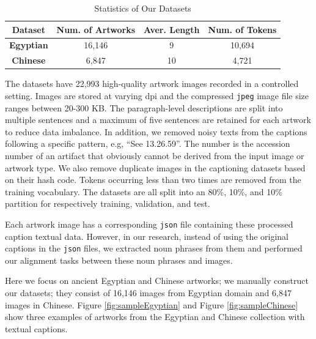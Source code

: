 \begin{table}[h!]
\centering
\begin{tabular}{|c|c|c|c|}
\hline
\textbf{Dataset}          & \textbf{Num. of Artworks} & \textbf{Aver. Length} & \textbf{Num. of Tokens} \\ \hline
\textbf{Egyptian} & 16,146                       & 9                       & 10,694                     \\ \hline
\textbf{Chinese}  & 6,847                        & 10                      & 4,721                      \\ \hline
\end{tabular}
\caption{Statistics of Our Datasets}
\label{fig:datasetstats}
\end{table}

The datasets have 22,993 high-quality artwork images recorded
in a controlled setting. Images are stored at varying dpi and the
compressed \verb|jpeg| image file size ranges between 20-300 KB. The paragraph-level descriptions are split into multiple sentences and a maximum of five sentences are retained for each artwork to reduce data imbalance. In addition, we removed noisy texts from the captions following a specific pattern, e.g, ``See 13.26.59''. The number is the accession number of an artifact that obviously cannot be derived from the input image or artwork type. We also remove duplicate images in the captioning datasets based on their hash code. Tokens occurring less than two times are removed from the training vocabulary. The datasets are all split into an 80\%, 10\%, and 10\% partition for respectively training, validation, and test.

Each artwork image has a corresponding \verb|json| file containing these processed caption textual data. However, in our research, instead of using the original captions in the \verb|json| files, we extracted noun phrases from them and performed our alignment tasks between these noun phrases and images.

Here we focus on ancient Egyptian and Chinese artworks; we manually construct our datasets; they consist of 16,146 images from Egyptian domain and 6,847 images in Chinese. Figure \ref{fig:sampleEgyptian} and Figure \ref{fig:sampleChinese} show three examples of artworks from the Egyptian and Chinese collection with textual captions.

